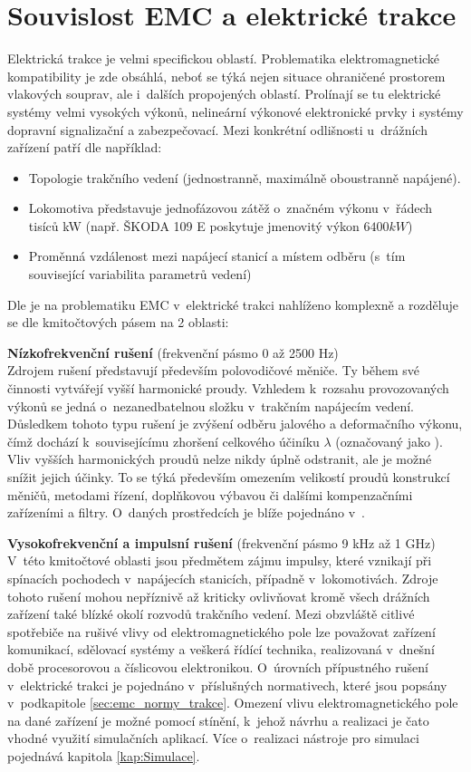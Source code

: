 \section{Souvislost EMC a elektrické trakce} \label{sec:emc_trakce}
Elektrická trakce je velmi specifickou oblastí. Problematika elektromagnetické kompatibility je zde obsáhlá, neboť se týká nejen situace ohraničené prostorem vlakových souprav, ale i~dalších propojených oblastí. Prolínají se tu elektrické systémy velmi vysokých výkonů, nelineární výkonové elektronické prvky i systémy dopravní signalizační a zabezpečovací. Mezi konkrétní odlišnosti u~drážních zařízení patří dle \cite{nfr} například:
\begin{itemize}
\item Topologie trakčního vedení (jednostranně, maximálně oboustranně napájené).
\item Lokomotiva představuje jednofázovou zátěž o~značném výkonu v~řádech tisíců kW (např. ŠKODA 109 E poskytuje jmenovitý výkon $6400 \unit{kW}$)
\item Proměnná vzdálenost mezi napájecí stanicí a místem odběru (s~tím související variabilita parametrů vedení)
\end{itemize}
Dle \cite{emc_trakce} je na problematiku EMC v~elektrické trakci nahlíženo komplexně a rozděluje se dle kmitočtových pásem na 2 oblasti:

\medskip
{\bf Nízkofrekvenční rušení} (frekvenční pásmo 0 až 2500 Hz) \\
Zdrojem rušení představují především polovodičové měniče. Ty během své činnosti vytvářejí vyšší harmonické proudy. Vzhledem k~rozsahu provozovaných výkonů se jedná o~nezanedbatelnou složku v~trakčním napájecím vedení. Důsledkem tohoto typu rušení je zvýšení odběru jalového a deformačního výkonu, čímž dochází k~souvisejícímu zhoršení celkového účiníku $\lambda$ (označovaný jako ). Vliv vyšších harmonických proudů nelze nikdy úplně odstranit, ale je možné snížit jejich účinky. To se týká především omezením velikostí proudů konstrukcí měničů, metodami řízení, doplňkovou výbavou či dalšími kompenzačními zařízeními a filtry. O~daných prostředcích je blíže pojednáno v~\cite{nfr}.

\medskip
{\bf Vysokofrekvenční a impulsní rušení} (frekvenční pásmo 9 kHz až 1 GHz) \\
V~této kmitočtové oblasti jsou předmětem zájmu impulsy, které vznikají při spínacích pochodech v~napájecích stanicích, případně v~lokomotivách. Zdroje tohoto rušení mohou nepříznivě až kriticky ovlivňovat kromě všech drážních zařízení také blízké okolí rozvodů trakčního vedení. Mezi obzvláště citlivé spotřebiče na rušivé vlivy od elektromagnetického pole lze považovat zařízení komunikací, sdělovací systémy a veškerá řídící technika, realizovaná v~dnešní době procesorovou a číslicovou elektronikou. O~úrovních přípustného rušení v~elektrické trakci je pojednáno v~příslušných normativech, které jsou popsány v~podkapitole \ref{sec:emc_normy_trakce}. Omezení vlivu elektromagnetického pole na dané zařízení je možné pomocí stínění, k~jehož návrhu a realizaci je čato vhodné využití simulačních aplikací. Více o~realizaci nástroje pro simulaci pojednává kapitola \ref{kap:Simulace}.
\newpage


